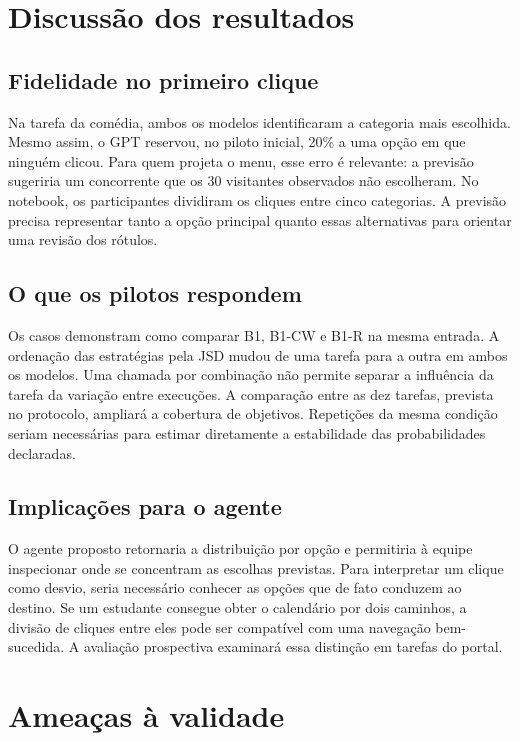 \documentclass[12pt]{article}
\begin{document}
\section{Discussão dos resultados}
\label{sec:discussao}
\subsection{Fidelidade no primeiro clique}
Na tarefa da comédia, ambos os modelos identificaram a categoria mais escolhida. Mesmo assim, o GPT reservou, no piloto inicial, 20\% a uma opção em que ninguém clicou. Para quem projeta o menu, esse erro é relevante: a previsão sugeriria um concorrente que os 30 visitantes observados não escolheram. No notebook, os participantes dividiram os cliques entre cinco categorias. A previsão precisa representar tanto a opção principal quanto essas alternativas para orientar uma revisão dos rótulos.

\subsection{O que os pilotos respondem}
Os casos demonstram como comparar B1, B1-CW e B1-R na mesma entrada. A ordenação das estratégias pela JSD mudou de uma tarefa para a outra em ambos os modelos. Uma chamada por combinação não permite separar a influência da tarefa da variação entre execuções. A comparação entre as dez tarefas, prevista no protocolo, ampliará a cobertura de objetivos. Repetições da mesma condição seriam necessárias para estimar diretamente a estabilidade das probabilidades declaradas.

\subsection{Implicações para o agente}
O agente proposto retornaria a distribuição por opção e permitiria à equipe inspecionar onde se concentram as escolhas previstas. Para interpretar um clique como desvio, seria necessário conhecer as opções que de fato conduzem ao destino. Se um estudante consegue obter o calendário por dois caminhos, a divisão de cliques entre eles pode ser compatível com uma navegação bem-sucedida. A avaliação prospectiva examinará essa distinção em tarefas do portal.

\section{Ameaças à validade}
\label{sec:ameacas}
\end{document}
